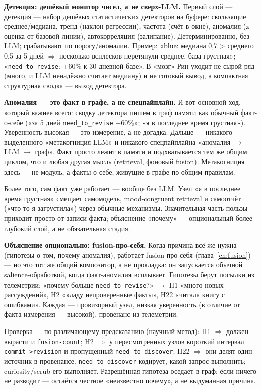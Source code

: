 \smallskip\noindent\textbf{Детекция: дешёвый монитор чисел, а не сверх-LLM.}
Первый слой --- детекция --- набор дешёвых статистических детекторов на
буфере: скользящие среднее/медиана, тренд (наклон регрессии), частота (счёт в
окне), аномалия (z-оценка от базовой линии), автокорреляция (залипание).
Детерминированно, без LLM; срабатывают по порогу/аномалии. Пример:
«blue: медиана 0,7 > среднего 0,5 за 5 дней $\Rightarrow$ несколько всплесков
перетянули среднее, база грустная»; «\texttt{need\_to\_revise}: +60\% к
30-дневной базе». В «мозг» Рин уходит не сырой ряд (много, и LLM ненадёжно
считает медиану) и не готовый вывод, а компактная структурная сводка ---
выход детектора.

\smallskip\noindent\textbf{Аномалия --- это факт в графе, а не спецпайплайн.}
И вот основной ход, который важнее всего: сводку детектора пишем в граф памяти
как обычный факт-о-себе («за 5 дней \texttt{need\_to\_revise} +60\%»; «я в
последнее время грустная»). Уверенность высокая --- это измерение, а не
догадка. Дальше --- никакого выделенного «метакогниция-LLM» и никакого
спецпайплайна «аномалия $\to$ LLM $\to$ граф». Факт просто лежит в памяти и
подхватывается тем же общим циклом, что и любая другая мысль (retrieval,
фоновый fusion). Метакогниция здесь --- не модуль, а факты-о-себе, живущие в
графе по общим правилам.

Более того, сам факт уже работает --- вообще без LLM. Узел «я в последнее
время грустная» смещает самомодель, mood-congruent retrieval и самоотчёт
(«что-то я загрустила») через обычные механизмы. Значительная часть пользы
приходит просто от записи факта; объяснение «почему» --- опциональный более
глубокий слой, а не обязательная стадия.

\smallskip\noindent\textbf{Объяснение опционально: fusion-про-себя.}
Когда причина всё же нужна (гипотезы о том, почему аномалия), работает
fusion-про-себя (глава~\ref{ch:fusion}) --- но это тот же общий композитор, а
не прокладка: он запускается обычной salience-обработкой, когда факт-аномалия
всплывает. Гипотезы берут посылки из телеметрии: «почему больше
\texttt{need\_to\_revise}?» $\to$ H1 «много новых рассуждений», H2 «кладу
непроверенные факты», H22 «читала книгу с ошибками». Каждая --- провизорный
узел, низкая уверенность (в отличие от факта-измерения --- высокой),
провенанс из телеметрии.

Проверка --- по различающему предсказанию (научный метод): H1 $\Rightarrow$
должен вырасти и \texttt{fusion-count}; H2 $\Rightarrow$ у пересмотренных узлов
короткий интервал \texttt{commit->revision} и пропущенный
\texttt{need\_to\_discover}; H22 $\Rightarrow$ они делят один источник в
провенансе. \texttt{need\_to\_discover} кодирует, какой запрос выполнить;
curiosity/scrub его выполняет. Разрешённая гипотеза оседает в граф; если ничего
не разводит --- остаётся честное «неизвестно почему», а не выдуманная причина.

